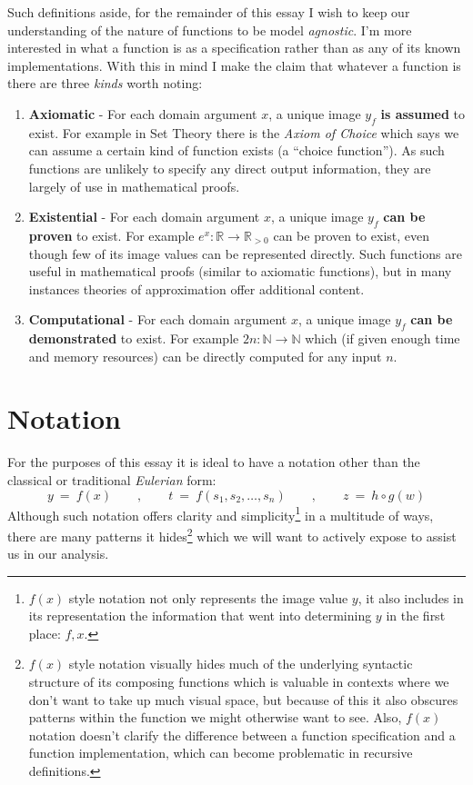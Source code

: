 \documentclass[twoside]{article}
\newcommand{\strong}[1]{{\bfseries #1}}
\begin{document}
Such definitions aside, for the remainder of this essay I wish to keep our understanding of the nature of functions
to be model \emph{agnostic}. I'm more interested in what a function is as a specification rather than as any of its
known implementations. With this in mind I make the claim that whatever a function is there are three \emph{kinds}
worth noting:
\begin{enumerate}
\item \strong{Axiomatic} - For each domain argument $ x $, a unique image $ y_f $ \strong{is assumed} to exist.
For example in Set Theory there is the \emph{Axiom of Choice} which says we can assume a certain kind of function exists
(a ``choice function''). As such functions are unlikely to specify any direct output information, they are largely
of use in mathematical proofs.
\item \strong{Existential} - For each domain argument $ x $, a unique image $ y_f $ \strong{can be proven} to exist.
For example $ e^x:\mathbb{R}\to\mathbb{R}_{> 0} $ can be proven to exist, even though few of its image values can be
represented directly. Such functions are useful in mathematical proofs (similar to axiomatic functions), but in many
instances theories of approximation offer additional content.
\item \strong{Computational} - For each domain argument $ x $, a unique image $ y_f $ \strong{can be demonstrated}
to exist. For example $ 2n:\mathbb{N}\to\mathbb{N} $ which (if given enough time and memory resources) can be directly
computed for any input $ n $.
\end{enumerate}

\section*{Notation}

For the purposes of this essay it is ideal to have a notation other than the classical or traditional \emph{Eulerian} form:
$$ y\ =\ f(x) \qquad , \qquad t\ =\ f(s_1,s_2,\ldots,s_n) \qquad , \qquad z\ =\ h \circ g (w) $$
Although such notation offers clarity and simplicity\footnote{$ f(x) $ style notation not only represents the image value
$ y $, it also includes in its representation the information that went into determining $ y $ in the first place: $ f, x $.}
in a multitude of ways, there are many patterns it hides\footnote{$ f(x) $ style notation visually hides much of
the underlying syntactic structure of its composing functions which is valuable in contexts where we don't want
to take up much visual space, but because of this it also obscures patterns within the function we might otherwise
want to see. Also, $ f(x) $ notation doesn't clarify the difference between a function specification and a function
implementation, which can become problematic in recursive definitions.} which we will want to actively expose
to assist us in our analysis.
\end{document}
